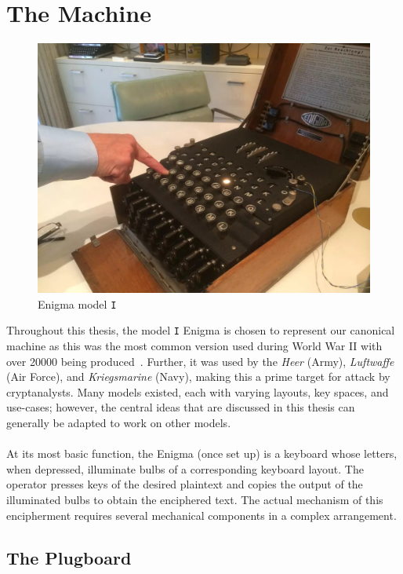 \section{The Machine}
\begin{figure}[H]
  \begin{center}\includegraphics[scale=0.3]{paper/images/enigma.jpg}
  \end{center}
  \label{ref:enigma}
  \caption{Enigma model \texttt{I}~\cite{latimes_enigma_2015}}
\end{figure}
Throughout this thesis, the model \texttt{I} Enigma is chosen to
represent our canonical machine as this was the most common version
used during World War II with over 20000 being produced~\cite{cryptomuseumEnigmaI}. Further, it
was used by the \emph{Heer} (Army), \emph{Luftwaffe} (Air
Force), and \emph{Kriegsmarine} (Navy), making this a prime target
for attack by cryptanalysts. Many models existed,
each with varying
layouts, key spaces, and use-cases; however, the central ideas that
are discussed in this thesis can generally be adapted to work on other models.
\\\\At its most basic function, the Enigma (once set up) is a
keyboard whose letters, when depressed, illuminate bulbs of a
corresponding keyboard layout. The operator presses keys of the
desired plaintext and copies the output of the illuminated bulbs to
obtain the enciphered text. The actual mechanism of this encipherment
requires several mechanical components in a complex arrangement.

\subsection{The Plugboard}

